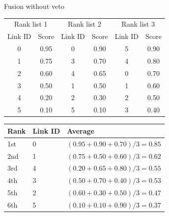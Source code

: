 \begin{example}
  \centering
  \caption{Fusion without veto}
  \label{ex:noveto}

  \begin{subexample}{\linewidth}
    \centering
    \begin{tabular}{c c|c c|c c}
      \toprule
      \multicolumn{2}{c}{Rank list 1} &
      \multicolumn{2}{c}{Rank list 2} &
      \multicolumn{2}{c}{Rank list 3} \\
      Link ID & Score &
      Link ID & Score &
      Link ID & Score \\
      \midrule
      0 & 0.95 & 0 & 0.90 & 5 & 0.90 \\
      1 & 0.75 & 3 & 0.70 & 4 & 0.80 \\
      2 & 0.60 & 4 & 0.65 & 0 & 0.70 \\
      3 & 0.50 & 1 & 0.50 & 1 & 0.60 \\
      4 & 0.20 & 2 & 0.30 & 2 & 0.50 \\
      5 & 0.10 & 5 & 0.10 & 3 & 0.40 \\
      \bottomrule
    \end{tabular}
  \end{subexample}

  \vspace{0.5cm}

  \begin{subexample}{\linewidth}
    \centering
    \begin{tabular}{l l l}
      \toprule
      Rank & Link ID & Average \\
      \midrule
      1st & 0 & $(0.95 + 0.90 + 0.70)/3 = 0.85$ \\
      2nd & 1 & $(0.75 + 0.50 + 0.60)/3 = 0.62$ \\
      3rd & 4 & $(0.20 + 0.65 + 0.80)/3 = 0.55$ \\
      4th & 3 & $(0.50 + 0.70 + 0.40)/3 = 0.53$ \\
      5th & 2 & $(0.60 + 0.30 + 0.50)/3 = 0.47$ \\
      6th & 5 & $(0.10 + 0.10 + 0.90)/3 = 0.37$ \\
      \bottomrule
    \end{tabular}
  \end{subexample}
\end{example}

